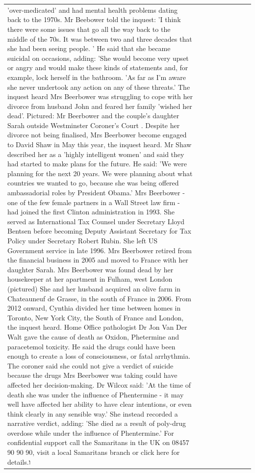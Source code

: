 \begin{table}[H]
\begin{tabular}{lllrlllll}
'over-medicated' and had mental health problems dating back to the 1970s. Mr Beebower told the inquest: 'I think there were some issues that go all the way back to the middle of the 70s. It was between two and three decades that she had been seeing people. ' He said that she became suicidal on occasions, adding: 'She would become very upset or angry and would make these kinds of statements and, for example, lock herself in the bathroom. 'As far as I'm aware she never undertook any action on any of these threats.' The inquest heard Mrs Beerbower was struggling to cope with her divorce from husband John and feared her family 'wished her dead'. Pictured: Mr Beerbower and the couple's daughter Sarah outside Westminster Coroner's Court . Despite her divorce not being finalised, Mrs Beerbower become engaged to David Shaw in May this year, the inquest heard. Mr Shaw described her as a 'highly intelligent women' and said they had started to make plans for the future. He said: 'We were planning for the next 20 years. We were planning about what countries we wanted to go, because she was being offered ambassadorial roles by President Obama.' Mrs Beerbower - one of the few female partners in a Wall Street law firm - had joined the first Clinton administration in 1993. She served as International Tax Counsel under Secretary Lloyd Bentsen before becoming Deputy Assistant Secretary for Tax Policy under Secretary Robert Rubin. She left US Government service in late 1996. Mrs Beerbower retired from the financial business in 2005 and moved to France with her daughter Sarah. Mrs Beerbower was found dead by her housekeeper at her apartment in Fulham, west London (pictured) She and her husband acquired an olive farm in Chateauneuf de Grasse, in the south of France in 2006. From 2012 onward, Cynthia divided her time between homes in Toronto, New York City, the South of France and London, the inquest heard. Home Office pathologist Dr Jon Van Der Walt gave the cause of death as Oxidon, Phetermine and paracetemol toxicity. He said the drugs could have been enough to create a loss of consciousness, or fatal arrhythmia. The coroner said she could not give a verdict of suicide because the drugs Mrs Beerbower was taking could have affected her decision-making. Dr Wilcox said: 'At the time of death she was under the influence of Phentermine - it may well have affected her ability to have clear intentions, or even think clearly in any sensible way.' She instead recorded a narrative verdict, adding: 'She died as a result of poly-drug overdose while under the influence of Phentermine.' For confidential support call the Samaritans in the UK on 08457 90 90 90, visit a local Samaritans branch or click here for details.ו \\

\end{tabular}
\end{table}
